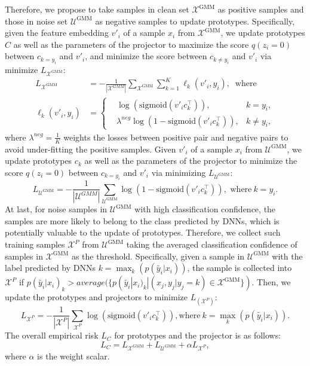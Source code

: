 \documentclass{article} \usepackage{iclr2023_conference,times}
\begin{document}
Therefore, we propose to take samples in clean set $\mathcal{X}^{\mathrm{GMM}}$ as positive samples and those in noise set $\mathcal{U}^{\mathrm{GMM}}$ as negative samples to update prototypes. Specifically, given the feature embedding $v'_i$ of a sample $x_i$ from $\mathcal{X}^{\mathrm{GMM}}$, we update prototypes $C$ as well as the parameters of the projector to maximize the score $q(z_i=0)$ between $c_{k=y_i}$ and $v'_i$, and minimize the score between $c_{k \neq y_i}$ and $v'_i$ via minimize $L_{\mathcal{X}^{\mathrm{GMM}}}$: 
\begin{equation}
\begin{aligned}
L_{\mathcal{X}^{\mathrm{GMM}}} &= - \frac{1}{|\mathcal{X}^{GMM}|} \sum_{\mathcal{X}^{\mathrm{GMM}}} \sum_{k=1}^{K} \ell_{k}(v'_i,y_i), ~\text{ where } \\
\ell_{k}(v'_i,y_i) &= \left\{
\begin{aligned}
& \log(\mathrm{sigmoid}(v'_i c_k^\top)), &k=y_i,\\
& \lambda^{neg} \log(1-\mathrm{sigmoid}( v'_i  c_k^\top)), & k \neq y_i,
\end{aligned}
\right.
\end{aligned}
\end{equation}
where $\lambda^{neg} = \frac{1}{K}$ weights the losses between positive pair and negative pairs to avoid under-fitting the positive samples. Given $v'_i$ of a sample $x_i$ from $ \mathcal{U}^{\mathrm{GMM}}$, we update prototypes $c_k$ as well as the parameters of the projector to minimize the score $q(z_i=0)$ between $ c_{k = y_i}$ and $ v'_i$ via minimizing $L_{\mathcal{U}^{\mathrm{GMM}}}$:
\begin{equation}
L_{\mathcal{U}^{\mathrm{GMM}}} = - \frac{1}{|\mathcal{U}^{GMM}|} \sum_{\mathcal{U}^{\mathrm{GMM}}} \log(1-\mathrm{sigmoid}( v'_i  c_k^\top)), \text{ where}~ k=y_i.
\end{equation}
At last, for noise samples in $\mathcal{U}^{\mathrm{GMM}}$ with high classification confidence, the samples are more likely to belong to the class predicted by DNNs, which is potentially valuable to the update of prototypes. Therefore, we collect such training samples $\mathcal{X}^{P}$ from $\mathcal{U}^{\mathrm{GMM}}$ taking the averaged classification confidence of samples in $\mathcal{X}^{\mathrm{GMM}}$ as the threshold. Specifically, given a sample in $\mathcal{U}^{\mathrm{GMM}}$ with the label predicted by DNNs $k=\max_k(p(\tilde{y_i}|x_i))$, the sample is collected into $\mathcal{X}^{P}$ if   $p(\tilde{y_i}|x_i)_k > average(\{p(\tilde{y_i}|x_i)_k| (x_j,y_j|y_j=k) \in \mathcal{X}^{\mathrm{GMM}}\})$. Then, we update the prototypes and projectors to minimize $L_{(\mathcal{X}^{P})}$:
\begin{equation}
L_{\mathcal{X}^{P}} = - \frac{1}{|\mathcal{X}^{P}|} \sum_{\mathcal{X}^{P}} \log(\mathrm{sigmoid}( v'_i  c_k^\top)), \text{where}~ k=\max_k(p(\tilde{y_i}|x_i)).
\end{equation}
The overall empirical risk $L_{C}$ for prototypes and the projector is as follows:
\begin{equation} \label{fullloss}
L_{C} = L_{\mathcal{X}^{\mathrm{GMM}}} + L_{\mathcal{U}^{\mathrm{GMM}}} + \alpha L_{\mathcal{X}^{P}},
\end{equation}
where $\alpha$ is the weight scalar.
\end{document}
